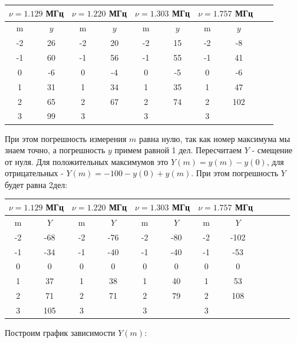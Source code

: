 \documentclass[14pt]{article}
\begin{document}
\begin{center}
\begin{tabular}{|c|c|c|c|c|c|c|c|c|c|}
\hline
\multicolumn{2}{|c|}{$\nu = 1.129$ МГц}	&	\multicolumn{2}{|c|}{$\nu = 1.220$ МГц}	&	\multicolumn{2}{|c|}{$\nu = 1.303$ МГц}	&	
\multicolumn{2}{|c|}{$\nu = 1.757$ МГц}	\\
\hline
m	&	$y$	&	m	&	$y$	&	m	&	$y$	&	m	&	$y$	\\
\hline
-2	&	26	&	-2	&	20	&	-2	&	15	&	-2	&	-8	\\
\hline
-1	&	60	&	-1	&	56	&	-1	&	55	&	-1	&	41	\\
\hline
0	&	-6	&	0	&	-4	&	0	&	-5	&	0	&	-6	\\
\hline
1	&	31	&	1	&	34	&	1	&	35	&	1	&	47	\\
\hline
2	&	65	&	2	&	67	&	2	&	74	&	2	&	102	\\
\hline
3	&	99	&	3	&		&	3	&		&	3	&		\\
\hline
\end{tabular}
\end{center}

При этом погрешность измерения $m$ равна нулю, так как номер максимума мы знаем точно, а погрешность $y$ примем равной 1 дел.
Пересчитаем $Y$ - смещение от нуля. Для положительных максимумов это $Y(m) = y(m) - y(0)$, для отрицательных - $Y(m) = -100 - y(0) + y(m)$. При этом погрешность $Y$ будет равна 2дел:

\begin{center}
\begin{tabular}{|c|c|c|c|c|c|c|c|c|c|c|c|}
\hline
\multicolumn{2}{|c|}{$\nu = 1.129$ МГц}	&	\multicolumn{2}{|c|}{$\nu = 1.220$ МГц}	&	\multicolumn{2}{|c|}{$\nu = 1.303$ МГц}	&
\multicolumn{2}{|c|}{$\nu = 1.757$ МГц}	\\
\hline
m	&	$Y$	&	m	&	$Y$	&	m	&	$Y$	&	m	&	$Y$		\\
\hline
-2	&	-68	&	-2	&	-76	&	-2	&	-80	&	-2	&	-102	\\
\hline
-1	&	-34	&	-1	&	-40	&	-1	&	-40	&	-1	&	-53		\\
\hline
0	&	0	&	0	&	0	&	0	&	0	&	0	&	0		\\
\hline
1	&	37	&	1	&	38	&	1	&	40	&	1	&	53		\\
\hline
2	&	71	&	2	&	71	&	2	&	79	&	2	&	108		\\
\hline
3	&	105	&	3	&		&	3	&		&	3	&			\\
\hline
\end{tabular}
\end{center}

Построим график зависимости $Y(m)$:
\end{document}
